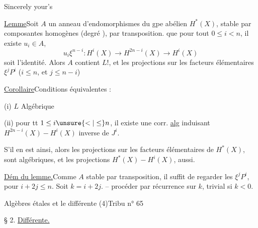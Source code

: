 Sincerely your's



\uline{Lemme}\quad Soit $A$ un anneau d'endomorphismes du gpe abélien $H^*(X)$, stable par composantes homogènes (degré ), par transposition.   que pour tout $0\leq i<n$, il existe $u_i\in A$, 
\[
u_i\xi^{n-i}:H^i(X)\longrightarrow H^{2n-i}(X)\longrightarrow H^{i}(X)
\]
soit l'identité.
Alors $A$ contient $L$!,  et les projections sur les facteurs élémentaires $\xi^jP^i$ ($i\leq n$, et  $j\leq n-i$)

\uline{Corollaire}\quad Conditions équivalentes :

(i) $L$ Algébrique

(ii) pour tt $1\leq i\unsure{<|\leq}n$, il existe une corr. \uline{alg} induisant $H^{2n-i}(X)\mathbin{-}H^i(X)$ inverse de $J^i$.

 S'il en est ainsi, alors les \deleted{$\unsure{\xi}$} projections sur les facteurs élémentaires de $H^*(X)$, sont algébriques, et les projections $H^*(X)\mathbin{-}H^i(X)$, aussi.

\uline{Dém du lemme.}\quad Comme $A$ stable par transposition, il suffit de regarder les $\xi^jP^i$, pour $i+2j\leq n$. Soit $k=i+2j$. -- procéder par récurrence sur $k$, trivial si $k<0$.



Algèbres étales et le différente (4)\hfill Tribu n° 65

§ 2. \uline{Différente.}

